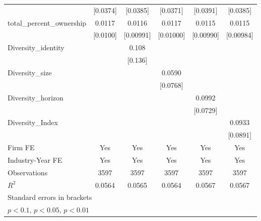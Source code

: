 {\begin{tabular}{l*{5}{c}}
            &    [0.0374]         &    [0.0385]         &    [0.0371]         &    [0.0391]         &    [0.0385]         \\
[1em]
total\_percent\_ownership&      0.0117         &      0.0116         &      0.0117         &      0.0115         &      0.0115         \\
            &    [0.0100]         &   [0.00991]         &   [0.01000]         &   [0.00990]         &   [0.00984]         \\
[1em]
Diversity\_identity&                     &       0.108         &                     &                     &                     \\
            &                     &     [0.136]         &                     &                     &                     \\
[1em]
Diversity\_size&                     &                     &      0.0590         &                     &                     \\
            &                     &                     &    [0.0768]         &                     &                     \\
[1em]
Diversity\_horizon&                     &                     &                     &      0.0992         &                     \\
            &                     &                     &                     &    [0.0729]         &                     \\
[1em]
Diversity\_Index&                     &                     &                     &                     &      0.0933         \\
            &                     &                     &                     &                     &    [0.0891]         \\
\hline
Firm FE     &         Yes         &         Yes         &         Yes         &         Yes         &         Yes         \\
Industry-Year FE&         Yes         &         Yes         &         Yes         &         Yes         &         Yes         \\
Observations&        3597         &        3597         &        3597         &        3597         &        3597         \\
$ R^2 $     &      0.0564         &      0.0565         &      0.0564         &      0.0567         &      0.0567         \\
\hline\hline
\multicolumn{6}{l}{\footnotesize Standard errors in brackets}\\
\multicolumn{6}{l}{\footnotesize \sym{*} \(p<0.1\), \sym{**} \(p<0.05\), \sym{***} \(p<0.01\)}\\
\end{tabular}
}
